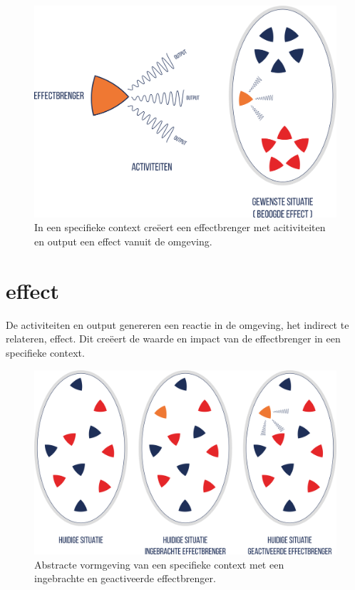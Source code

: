 \documentclass[
]{book}
\begin{document}
\begin{figure}

{\centering \includegraphics[width=0.45\linewidth]{data/images/20210324-MDI-effectbrenger-ei} 

}

\caption{In een specifieke context creëert een effectbrenger met acitiviteiten en output een effect vanuit de omgeving.}\label{fig:effectbrenger-met-ei}
\end{figure}

\hypertarget{effect}{%
\section{effect}\label{effect}}

De activiteiten en output genereren een reactie in de omgeving, het indirect te relateren, effect. Dit creëert de waarde en impact van de effectbrenger in een specifieke context.

\begin{figure}

{\centering \includegraphics[width=0.85\linewidth]{data/images/20210324-MDI-eieren-huidig} 

}

\caption{Abstracte vormgeving van een specifieke context met een ingebrachte en geactiveerde effectbrenger.}\label{fig:effectbrenger-in-eieren}
\end{figure}
\end{document}
